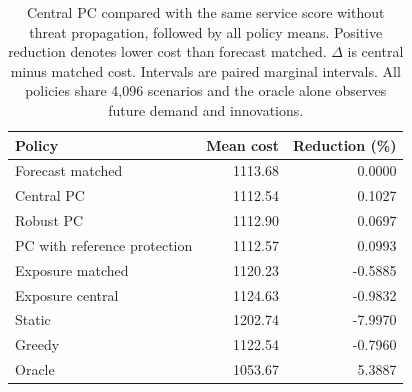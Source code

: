 \begin{table}[t]
\centering
\caption{Central PC compared with the same service score without threat propagation, followed by all policy means. Positive reduction denotes lower cost than forecast matched. $\Delta$ is central minus matched cost. Intervals are paired marginal intervals. All policies share 4,096 scenarios and the oracle alone observes future demand and innovations.}
\label{tab:robust-boulder}
\footnotesize
\setlength{\tabcolsep}{3pt}
\vspace{3pt}
\begin{tabular}{@{}lrr@{}}
\toprule
Policy & Mean cost & Reduction (\%) \\
\midrule
Forecast matched & 1113.68 & 0.0000 \\
Central PC & 1112.54 & 0.1027 \\
Robust PC & 1112.90 & 0.0697 \\
PC with reference protection & 1112.57 & 0.0993 \\
Exposure matched & 1120.23 & -0.5885 \\
Exposure central & 1124.63 & -0.9832 \\
Static & 1202.74 & -7.9970 \\
Greedy & 1122.54 & -0.7960 \\
Oracle & 1053.67 & 5.3887 \\
\bottomrule
\end{tabular}
\end{table}
